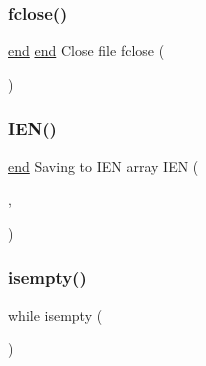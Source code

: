 \subsubsection{\texorpdfstring{fclose()}{fclose()}}
{\footnotesize\ttfamily \hyperlink{a00608_afb358f48b1646c750fb9da6c6585be2b}{end} \hyperlink{a00608_afb358f48b1646c750fb9da6c6585be2b}{end} Close file fclose (\begin{DoxyParamCaption}\item[{Fid}]{ }\end{DoxyParamCaption})}

\mbox{\label{a00608_ada37e689768b959686f183a3d534464b}} 
\subsubsection{\texorpdfstring{I\+E\+N()}{IEN()}}
{\footnotesize\ttfamily \hyperlink{a00608_afb358f48b1646c750fb9da6c6585be2b}{end} Saving to I\+EN array I\+EN (\begin{DoxyParamCaption}\item[{\hyperlink{a00605_a6086917dfee54d84abe1838505c8cf69}{k}}]{,  }\item[{1\+:\hyperlink{a00608_af770575536260d1af58b8fddaaefb98d}{nloc}}]{ }\end{DoxyParamCaption})}

\mbox{\label{a00608_ad2a182e2e8932167c056732723f13e1c}} 
\subsubsection{\texorpdfstring{isempty()}{isempty()}}
{\footnotesize\ttfamily while isempty (\begin{DoxyParamCaption}\item[{intersect(\hyperlink{a00608_a1d1b0d42391bd99b4214d9216b163807}{line}, \textquotesingle{}E\+N\+D\+O\+F\+S\+E\+C\+T\+I\+ON\textquotesingle{})}]{ }\end{DoxyParamCaption})}

\mbox{\label{a00608_a9fd973fb7dcbed4123ae5eb2f3868e61}} 

